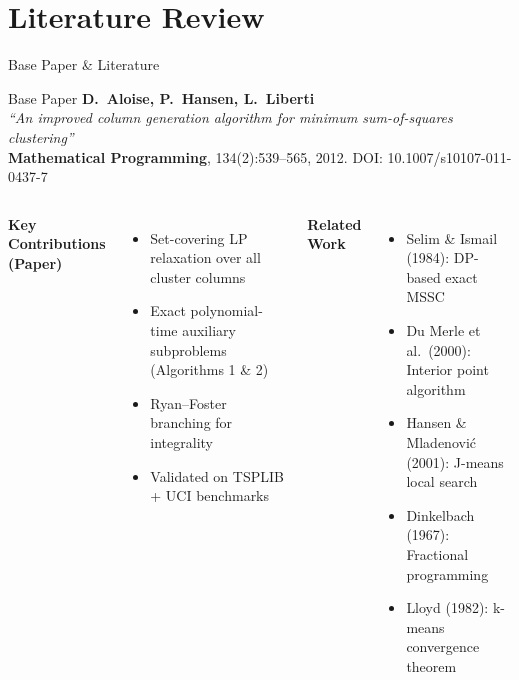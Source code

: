 \documentclass[aspectratio=169,12pt]{beamer}
\begin{document}
\section{Literature Review}

\begin{frame}{Base Paper \& Literature}
  \begin{block}{Base Paper}
    \textbf{D.\ Aloise, P.\ Hansen, L.\ Liberti} \\
    \textit{``An improved column generation algorithm for minimum sum-of-squares clustering''} \\
    \textbf{Mathematical Programming}, 134(2):539--565, 2012.
    \quad DOI: 10.1007/s10107-011-0437-7
  \end{block}

  \vspace{0.3em}
  \begin{columns}[T]
      \textbf{Key Contributions (Paper)}
      \begin{itemize}
        \item Set-covering LP relaxation over all cluster columns
        \item Exact polynomial-time auxiliary subproblems (Algorithms 1 \& 2)
        \item Ryan--Foster branching for integrality
        \item Validated on TSPLIB + UCI benchmarks
      \end{itemize}

      \textbf{Related Work}
      \begin{itemize}
        \item \small Selim \& Ismail (1984): DP-based exact MSSC
        \item \small Du Merle et al.\ (2000): Interior point algorithm
        \item \small Hansen \& Mladenović (2001): J-means local search
        \item \small Dinkelbach (1967): Fractional programming
        \item \small Lloyd (1982): k-means convergence theorem
      \end{itemize}
  \end{columns}
\end{frame}

\end{document}
